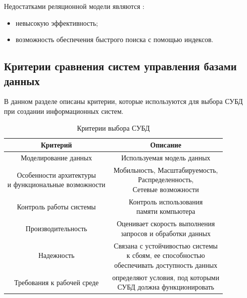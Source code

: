 Недостатками реляционной модели являются \cite{instument}:
\begin{itemize}
	\item невысокую эффективность;
	\item возможность обеспечения быстрого поиска с помощью индексов.
\end{itemize}

\subsection{Критерии сравнения систем управления базами данных}

В данном разделе описаны критерии, которые используются для выбора
СУБД при создании информационных систем.

\begin{table}[h]
	\begin{center}
		\begin{threeparttable}
			\captionsetup{justification=raggedright,singlelinecheck=off}
			\caption{Критерии выбора СУБД \cite{one}}
			\label{tbl:time_even}
			\begin{tabular}{|c|c|}
				\hline
				Критерий & Описание\\
				\hline Моделирование данных & Используемая модель данных\\	
				\hline \makecell{Особенности архитектуры \\ и функциональные возможности} & \makecell{Мобильность, Масштабируемость, \\Распределенность, \\Сетевые возможности}\\
				\hline Контроль работы системы & \makecell{Контроль использования \\ памяти компьютера}\\
				\hline Производительность & \makecell{Оценивает скорость выполнения\\запросов и обработки данных}\\
				\hline Надежность & \makecell{Связана с устойчивостью системы\\к сбоям, ее способностью \\обеспечивать доступность данных}\\
				\hline Требования к рабочей среде & \makecell{определяют условия, под которыми\\ СУБД должна функционировать}\\\hline
			\end{tabular}
		\end{threeparttable}
	\end{center}
\end{table}

